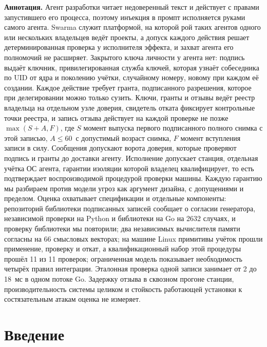 \documentclass[10pt,a4paper]{article}
\begin{document}
\begin{list}{}{\leftmargin=0.6cm\rightmargin=0.6cm}
\item\small
\textbf{Аннотация.} Агент разработки читает недоверенный текст и действует с правами запустившего его процесса, поэтому инъекция в промпт исполняется руками самого агента. Swarma служит платформой, на которой рой таких агентов одного или нескольких владельцев ведёт проекты, а допуск каждого действия решает детерминированная проверка у исполнителя эффекта, и захват агента его полномочий не расширяет. Закрытого ключа личности у агента нет: подпись выдаёт ключник, привилегированная служба ключей, которая узнаёт собеседника по UID от ядра и поколению учётки, случайному номеру, новому при каждом её создании. Каждое действие требует гранта, подписанного разрешения, которое при делегировании можно только сузить. Ключи, гранты и отзывы ведёт реестр владельца на отдельном узле доверия, свидетель отката фиксирует контрольные точки реестра, и запись отзыва действует на каждой проверке не позже $\max(S+A,F)$, где $S$ момент выпуска первого подписанного полного снимка с этой записью, $A\le60$~с допустимый возраст снимка, $F$ момент вступления записи в силу. Сообщения допускают ворота доверия, которые проверяют подпись и гранты до доставки агенту. Исполнение допускает станция, отдельная учётка ОС агента, гарантии изоляции которой владелец квалифицирует, то есть подтверждает воспроизводимой процедурой проверки машины. Каждую гарантию мы разбираем против модели угроз как аргумент дизайна, с допущениями и пределом. Оценка охватывает спецификации и отдельные компоненты: репозиторий библиотеки подписанных записей сообщает о согласии генератора, независимой проверки на Python и библиотеки на Go на 2632 случаях, и проверку библиотеки мы повторили; два независимых вычислителя памяти согласны на 66 смысловых векторах; на машине Linux примитивы учёток прошли применение, проверку и откат, а квалификационный набор этой процедуры прошёл 11 из 11 проверок; ограниченная модель показывает необходимость четырёх правил интеграции. Эталонная проверка одной записи занимает от 2 до 18~мс в одном потоке Go. Задержку отзыва в сквозном прогоне станции, производительность системы целиком и стойкость работающей установки к состязательным атакам оценка не измеряет.
\end{list}

\section{Введение}
\label{sec:intro}
\end{document}
